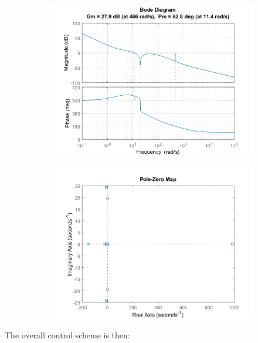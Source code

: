 \begin{figure}[H]
     \centering
     \begin{subfigure}{0.47\textwidth}
         \centering
         \includegraphics[width=\textwidth]{./images/Chapter 3/Bode OL controlled.png}
     \end{subfigure}
     \hfill
     \begin{subfigure}{0.47\textwidth}
         \centering
         \includegraphics[width=\textwidth]{./images/Chapter 3/pzmap controlled.png}
     \end{subfigure}
\end{figure}


The overall control scheme is then:

